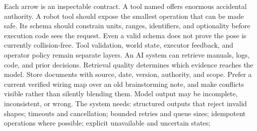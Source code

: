 {}Each arrow is an inspectable contract.\markdownRendererInterblockSeparator
{}
\markdownRendererSectionEnd \markdownRendererSectionBegin
{}\markdownRendererInterblockSeparator
{}A tool named  offers enormous accidental authority. A\markdownRendererSoftLineBreak
{}robot tool should expose the smallest operation that can be made safe. Its\markdownRendererSoftLineBreak
{}schema should constrain units, ranges, identifiers, and optionality before\markdownRendererSoftLineBreak
{}execution code sees the request.\markdownRendererInterblockSeparator
{}\markdownRendererInterblockSeparator
{}Even a valid schema does not prove the pose is currently collision-free. Tool\markdownRendererSoftLineBreak
{}validation, world state, executor feedback, and operator policy remain separate\markdownRendererSoftLineBreak
{}layers.\markdownRendererInterblockSeparator
{}
\markdownRendererSectionEnd \markdownRendererSectionBegin
{}\markdownRendererInterblockSeparator
{}An AI system can retrieve manuals, logs, code, and prior decisions. Retrieval\markdownRendererSoftLineBreak
{}quality determines which evidence reaches the model. Store documents with\markdownRendererSoftLineBreak
{}source, date, version, authority, and scope. Prefer a current verified wiring\markdownRendererSoftLineBreak
{}map over an old brainstorming note, and make conflicts visible rather than\markdownRendererSoftLineBreak
{}silently blending them.\markdownRendererInterblockSeparator
{}
\markdownRendererSectionEnd \markdownRendererSectionBegin
{}\markdownRendererInterblockSeparator
{}Model output may be incomplete, inconsistent, or wrong. The system needs:\markdownRendererInterblockSeparator
{}\markdownRendererUlBegin
\markdownRendererUlItem structured outputs that reject invalid shapes;\markdownRendererUlItemEnd 
\markdownRendererUlItem timeouts and cancellation;\markdownRendererUlItemEnd 
\markdownRendererUlItem bounded retries and queue sizes;\markdownRendererUlItemEnd 
\markdownRendererUlItem idempotent operations where possible;\markdownRendererUlItemEnd 
\markdownRendererUlItem explicit unavailable and uncertain states;\markdownRendererUlItemEnd 
